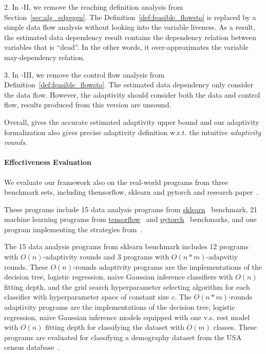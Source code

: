 2. In {\THESYSTEM}-II, we remove the reaching definition analysis from Section~\ref{sec:alg_edgegen}.
The Definition~\ref{def:feasible_flowsto} is replaced by a simple data flow analysis without looking into the variable liveness.
As a result, the estimated data dependency result contains the dependency relation between variables that is ``dead''. In the other words, it over-approximates the variable may-dependency relation.

3. In {\THESYSTEM}-III, we remove the control flow analysis from Definition~\ref{def:feasible_flowsto}.
The estimated data dependency only consider the data flow.
However, the adaptivity should consider both the data and control flow, results produced from this version are unsound.

Overall, {\THESYSTEM} gives the accurate estimated
adaptivity upper bound and our adaptivity formalization also gives precise adaptivity definition w.r.t. the intuitive \emph{adaptivity rounds}.



\paragraph{Effectiveness Evaluation}
We evaluate our framework also on the real-world programs from
three benchmark sets, including thensorflow, sklearn and pytorch and research paper~\cite{Jamieson2015TheAO}.


These programs include  
15 data analysis programs 
from \hyperlink{https://github.com/scikit-learn/scikit-learn/tree/main/examples}{sklearn}~\cite{SklearnBenchmark} benchmark,
21 machine learning programs
from \hyperlink{https://github.com/tensorflow/tensorflow/tree/master/tensorflow/examples}{tensorflow}~\cite{TensorflowBenchmark} 
and \hyperlink{https://github.com/pytorch/pytorch}{pytorch}~\cite{PytorchBenchmark}
benchmarks,
and {one program implementing the strategies from~\cite{Jamieson2015TheAO}}.

The 15 data analysis programs 
from sklearn benchmark includes 12 programs with $O(n)$-adaptivity rounds
and 3 programs with $O(n*m)$-adapvitiy rounds.
These $O(n)$-rounds adaptivity programs are
the
implementations of the decision tree, logistic regression, naive Gaussian inference classifiers
with $O(n)$ fitting depth,
and the grid search hyperparameter selecting algorithm for each classifier with 
hyperparameter space of constant size $c$.
The $O(n*m)$-rounds adaptivity programs are
the implementations of the  decision tree, logistic regression, naive Gaussian inference models equipped with one v.s. rest model with $O(n)$ fitting depth for classifying the dataset with $O(m)$ classes.
These programs are evaluated for classifying a demography dataset from 
the USA census database~\cite{CensusDatabase}.


